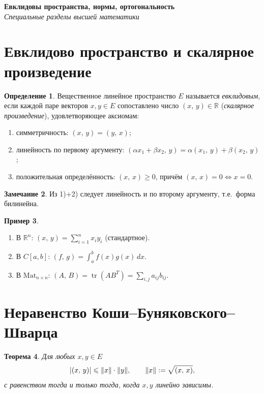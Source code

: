 \documentclass[11pt,a4paper]{article}
\newcommand{\coursename}{Специальные разделы высшей математики}
\newcommand{\doctitle}{Евклидовы пространства, нормы, ортогональность}
\theoremstyle{definition}
\newtheorem{definition}{Определение}[section]
\newtheorem{example}[definition]{Пример}
\newtheorem{remark}[definition]{Замечание}
\theoremstyle{plain}
\newtheorem{theorem}[definition]{Теорема}
\DeclareMathOperator{\tr}{tr}
\newcommand{\R}{\mathbb{R}}
\newcommand{\dx}{\,dx}
\renewcommand{\le}{\leqslant}
\renewcommand{\ge}{\geqslant}
\newcommand{\scal}[2]{\left( #1,\,#2\right)}
\DeclarePairedDelimiter{\abs}{\lvert}{\rvert}
\DeclarePairedDelimiter{\norm}{\lVert}{\rVert}
\begin{document}
\begin{center}
  {\LARGE\bfseries \doctitle}\\[4pt]
  {\large\itshape \coursename}
\end{center}
\vspace{6pt}

\section{Евклидово пространство и скалярное произведение}

\begin{definition}
Вещественное линейное пространство $E$ называется \emph{евклидовым}, если каждой паре векторов
$x,y\in E$ сопоставлено число $\scal xy\in\R$ (\emph{скалярное произведение}), удовлетворяющее
аксиомам:
\begin{enumerate}[label=\arabic*),leftmargin=*,nosep]
  \item симметричность: $\scal xy=\scal yx$;
  \item линейность по первому аргументу: $\scal{\alpha x_1+\beta x_2}{y}=\alpha\scal{x_1}y+\beta\scal{x_2}y$;
  \item положительная определённость: $\scal xx\ge0$, причём $\scal xx=0\iff x=0$.
\end{enumerate}
\end{definition}

\begin{remark}
Из 1)+2) следует линейность и по второму аргументу, т.е.\ форма билинейна.
\end{remark}

\begin{example}\leavevmode
\begin{enumerate}[label=\arabic*),leftmargin=*,nosep]
  \item В $\R^n$: $\scal xy=\sum_{i=1}^n x_iy_i$ (стандартное).
  \item В $C[a,b]$: $\displaystyle\scal fg=\int_a^b f(x)g(x)\dx$.
  \item В $\mathrm{Mat}_{n\times n}$: $\scal AB=\tr(AB^{T})=\sum_{i,j}a_{ij}b_{ij}$.
\end{enumerate}
\end{example}

\section{Неравенство Коши–Буняковского–Шварца}

\begin{theorem}
Для любых $x,y\in E$
\[
  \abs{\scal xy}\le\norm x\cdot\norm y,\qquad \norm x:=\sqrt{\scal xx},
\]
с равенством тогда и только тогда, когда $x,y$ линейно зависимы.
\end{theorem}
\end{document}
